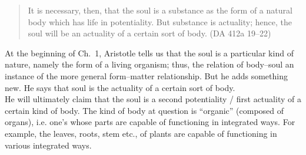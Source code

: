 \documentclass[11pt]{article}
\begin{document}
\begin{quote}
It is necessary, then, that the soul is a substance as the form of a natural body which has life in potentiality. But substance is actuality; hence, the soul will be an actuality of a certain sort of body.
(DA 412a 19–22)
\end{quote}

\noindent At the beginning of Ch.~1, Aristotle tells us that the soul is a particular kind of nature, namely the form of a living organism; thus, the relation of body--soul an instance of the more general form--matter relationship. But he adds something new. He says that soul is the actuality of a certain sort of body.\\

\noindent He will ultimately claim that the soul is a second potentiality / first actuality of a certain kind of body. The kind of body at question is ``organic'' (composed of organs), i.e. one's whose parts are capable of functioning in integrated ways. For example, the leaves, roots, stem etc., of plants are capable of functioning in various integrated ways.\\







\end{document}
